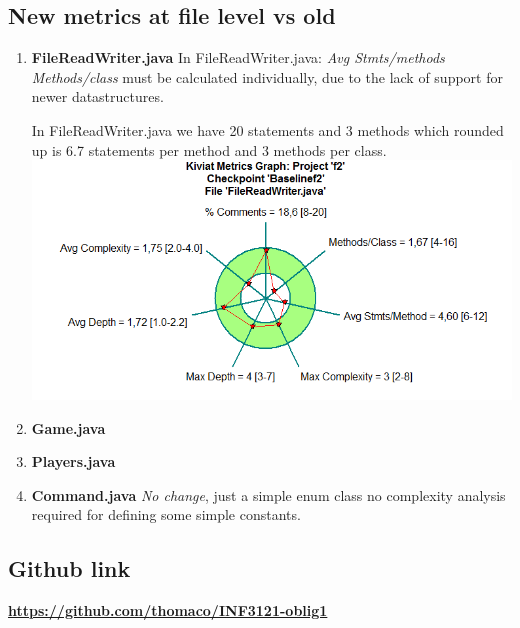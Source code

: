 \documentclass{article}
\begin{document}
\subsection{New metrics at file level vs old} %
\begin{enumerate}
	\item
	\textbf{FileReadWriter.java}
	In FileReadWriter.java:\newline
	\textit{Avg Stmts/methods Methods/class} must be calculated individually, due to the lack
	of support for newer datastructures.

	In FileReadWriter.java we have 20 statements and 3 methods which 
	rounded up is 6.7 statements per method and 3 methods per class.\newline
	\includegraphics[scale=0.4]{Kiviat-filereadwriter-after.png}\newline

	\item
	\textbf{Game.java}

	\item
	\textbf{Players.java} %


	\item%
	\textbf{Command.java}
	\textit{No change}, just a simple enum class no complexity analysis 
	required for defining some simple constants. 

\end{enumerate}


\subsection{Github link}
\href{https://github.com/thomaco/INF3121-oblig1}{\textbf{https://github.com/thomaco/INF3121-oblig1}}
\end{document}
